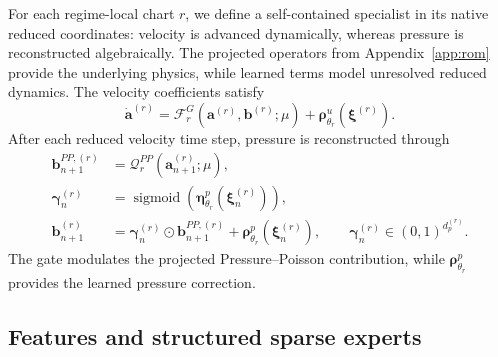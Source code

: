 \documentclass{article}
\begin{document}
For each regime-local chart $r$, we define a self-contained 
specialist in its native reduced coordinates: velocity is advanced
dynamically, whereas pressure is reconstructed algebraically.
The projected operators from Appendix~\ref{app:rom} provide the underlying physics, while learned terms model unresolved reduced dynamics. The velocity coefficients satisfy
\begin{equation}
  \dot{\bm a}^{(r)}
  =
  \mathcal F_r^G
  \left(
    \bm a^{(r)},\bm b^{(r)};\mu
  \right)
  +
  \bm\rho^u_{\theta_r}
  \left(
    \bm\xi^{(r)}
  \right).
  \label{eq:app_hybrid_velocity_rhs}
\end{equation}
After each reduced velocity time step, pressure is reconstructed through
\begin{align}
  \bm b_{n+1}^{PP,(r)}
  &=
  \mathcal Q_r^{PP}
  \left(
    \bm a_{n+1}^{(r)};\mu
  \right),
  \nonumber\\
  \bm\gamma_n^{(r)}
  &=
  \operatorname{sigmoid}
  \left(
    \bm\eta^p_{\theta_r}
    (\bm\xi_n^{(r)})
  \right),
  \nonumber\\
  \bm b_{n+1}^{(r)}
  &=
  \bm\gamma_n^{(r)}
  \odot
  \bm b_{n+1}^{PP,(r)}
  +
  \bm\rho^p_{\theta_r}
  (\bm\xi_n^{(r)}),
  \qquad
  \bm\gamma_n^{(r)}
  \in(0,1)^{d_p^{(r)}}.
  \label{eq:app_pressure_closure}
\end{align}
The gate modulates the projected Pressure--Poisson contribution, while
$\bm\rho^p_{\theta_r}$ provides the learned pressure correction.


\subsection{Features and structured sparse experts}
\end{document}
